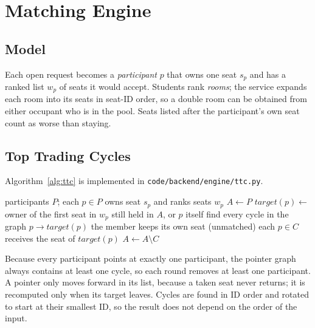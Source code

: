 \documentclass{tietreport}
\begin{document}
\section{Matching Engine}

\subsection{Model}

Each open request becomes a \emph{participant} $p$ that owns one
seat $s_p$ and has a ranked list $w_p$ of seats it would accept.
Students rank \emph{rooms}; the service expands each room into its
seats in seat-ID order, so a double room can be obtained from either
occupant who is in the pool. Seats listed after the participant's own
seat count as worse than staying.

\subsection{Top Trading Cycles}

Algorithm~\ref{alg:ttc} is implemented in
\texttt{code/backend/engine/ttc.py}.

\begin{algorithm}[H]
\caption{Top Trading Cycles as implemented in CampusSwap}
\label{alg:ttc}
\begin{algorithmic}[1]
\Require participants $P$; each $p \in P$ owns seat $s_p$ and ranks seats $w_p$
\State $A \gets P$ 
    \State $\mathit{target}(p) \gets$ owner of the first seat in $w_p$ still held in $A$, or $p$ itself
  \EndFor
  \State find every cycle in the graph $p \rightarrow \mathit{target}(p)$
      \State the member keeps its own seat (unmatched)
    \Else
      \State each $p \in C$ receives the seat of $\mathit{target}(p)$
    \EndIf
    \State $A \gets A \setminus C$
  \EndFor
\EndWhile
\end{algorithmic}
\end{algorithm}

Because every participant points at exactly one participant, the
pointer graph always contains at least one cycle, so each round
removes at least one participant. A pointer only moves forward in
its list, because a taken seat never returns; it is recomputed only
when its target leaves. Cycles are found in ID order and rotated to
start at their smallest ID, so the result does not depend on the order
of the input.
\end{document}

